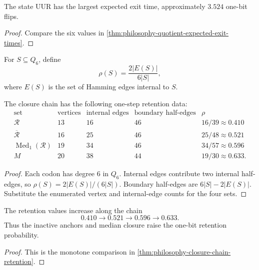 \begin{corollary}
\label{cor:philosophy-uur-bridge-residence}
The state $\mathrm{UUR}$ has the largest expected exit time,
approximately $3.524$ one-bit flips.
\end{corollary}
\begin{proof}
Compare the six values in
\autoref{thm:philosophy-quotient-expected-exit-times}.
\end{proof}

\begin{definition}
\label{def:philosophy-one-step-retention}
For $S\subseteq Q_{6}$, define
$$
  \rho(S)=\frac{2|E(S)|}{6|S|},
$$
where $E(S)$ is the set of Hamming edges internal to $S$.
\end{definition}

\begin{theorem}
\label{thm:philosophy-closure-chain-retention}
The closure chain has the following one-step retention data:
$$
\begin{array}{c|r|r|r|r}
  \text{set} & \text{vertices} & \text{internal edges}
  & \text{boundary half-edges} & \rho\\
  \hline
  \mathcal{R} & 13 & 16 & 46 & 16/39\approx 0.410\\
  \overline{\mathcal{R}} & 16 & 25 & 46 & 25/48\approx 0.521\\
  \operatorname{Med}_{1}(\mathcal{R}) & 19 & 34 & 46 & 34/57\approx 0.596\\
  M & 20 & 38 & 44 & 19/30\approx 0.633.
\end{array}
$$
\end{theorem}
\begin{proof}
Each codon has degree $6$ in $Q_{6}$. Internal edges contribute two
internal half-edges, so $\rho(S)=2|E(S)|/(6|S|)$. Boundary half-edges
are $6|S|-2|E(S)|$. Substitute the enumerated vertex and internal-edge
counts for the four sets.
\end{proof}

\begin{corollary}
\label{cor:philosophy-median-closure-local-stabilization}
The retention values increase along the chain
$$
  0.410\to 0.521\to 0.596\to 0.633.
$$
Thus the inactive anchors and median closure raise the one-bit
retention probability.
\end{corollary}
\begin{proof}
This is the monotone comparison in
\autoref{thm:philosophy-closure-chain-retention}.
\end{proof}

